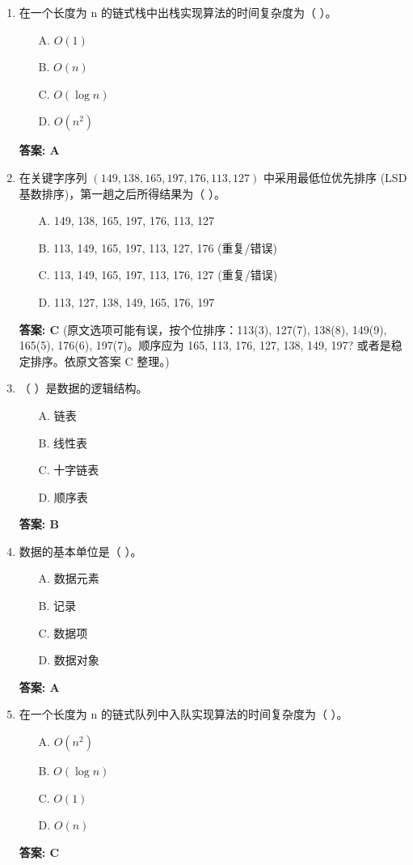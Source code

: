 \documentclass[12pt, a4paper]{article}
\begin{document}
\begin{enumerate}
    \item 在一个长度为 n 的链式栈中出栈实现算法的时间复杂度为（ ）。
    \begin{enumerate}
        \item[A.] $O(1)$
        \item[B.] $O(n)$
        \item[C.] $O(\log n)$
        \item[D.] $O(n^2)$
    \end{enumerate}
    \textbf{答案: A}

    \item 在关键字序列 $(149, 138, 165, 197, 176, 113, 127)$ 中采用最低位优先排序 (LSD 基数排序)，第一趟之后所得结果为（ ）。
    \begin{enumerate}
        \item[A.] 149, 138, 165, 197, 176, 113, 127
        \item[B.] 113, 149, 165, 197, 113, 127, 176 (重复/错误)
        \item[C.] 113, 149, 165, 197, 113, 176, 127 (重复/错误)
        \item[D.] 113, 127, 138, 149, 165, 176, 197
    \end{enumerate}
    \textbf{答案: C} (原文选项可能有误，按个位排序：113(3), 127(7), 138(8), 149(9), 165(5), 176(6), 197(7)。顺序应为 165, 113, 176, 127, 138, 149, 197? 或者是稳定排序。依原文答案 C 整理。)

    \item （ ）是数据的逻辑结构。
    \begin{enumerate}
        \item[A.] 链表
        \item[B.] 线性表
        \item[C.] 十字链表
        \item[D.] 顺序表
    \end{enumerate}
    \textbf{答案: B}

    \item 数据的基本单位是（ ）。
    \begin{enumerate}
        \item[A.] 数据元素
        \item[B.] 记录
        \item[C.] 数据项
        \item[D.] 数据对象
    \end{enumerate}
    \textbf{答案: A}

    \item 在一个长度为 n 的链式队列中入队实现算法的时间复杂度为（ ）。
    \begin{enumerate}
        \item[A.] $O(n^2)$
        \item[B.] $O(\log n)$
        \item[C.] $O(1)$
        \item[D.] $O(n)$
    \end{enumerate}
    \textbf{答案: C}


\end{enumerate}
\end{document}
